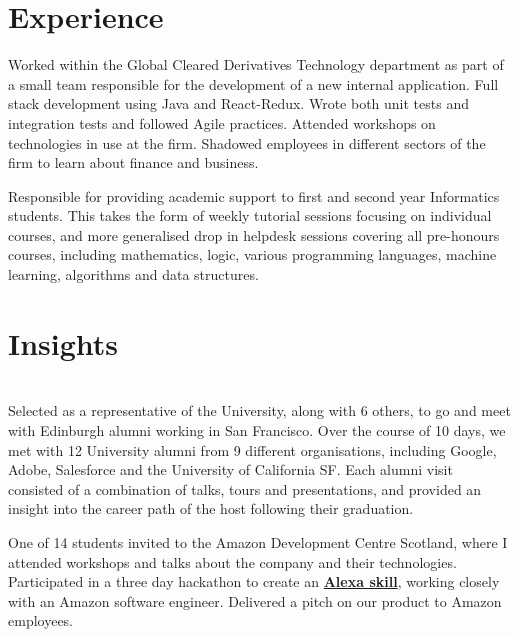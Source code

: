 \documentclass[]{deedy-resume-openfont}
\begin{document}
\begin{minipage}[t]{0.66\textwidth} 


\section{Experience}
Worked within the Global Cleared Derivatives Technology department as part of a small team responsible for the development of a new internal application. Full stack development using Java and React-Redux. Wrote both unit tests and integration tests and followed Agile practices. Attended workshops on technologies in use at the firm. Shadowed employees in different sectors of the firm to learn about finance and business.
\sectionsep
\sectionsep

Responsible for providing academic support to first and second year Informatics students. This takes the form of weekly tutorial sessions focusing on individual courses, and more generalised drop in helpdesk sessions covering all pre-honours courses, including mathematics, logic, various programming languages, machine learning, algorithms and data structures.
\sectionsep


\section{Insights}
 \\
Selected as a representative of the University, along with 6 others, to go and meet with Edinburgh alumni working in San Francisco. Over the course of 10 days, we met with 12 University alumni from 9 different organisations, including Google, Adobe, Salesforce and the University of California SF. Each alumni visit consisted of a combination of talks, tours and presentations, and provided an insight into the career path of the host following their graduation.
\sectionsep
\sectionsep

One of 14 students invited to the Amazon Development Centre Scotland, where I attended workshops and talks about the company and their technologies. Participated in a three day hackathon to create an \href{https://github.com/kimbethstonehouse/asking-for-travel}{\bf Alexa skill}, working closely with an Amazon software engineer. Delivered a pitch on our product to Amazon employees.
\sectionsep
\sectionsep


\end{minipage}
\end{document}
